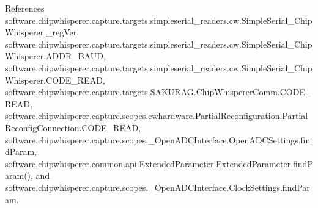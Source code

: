 References software.\+chipwhisperer.\+capture.\+targets.\+simpleserial\+\_\+readers.\+cw.\+Simple\+Serial\+\_\+\+Chip\+Whisperer.\+\_\+reg\+Ver, software.\+chipwhisperer.\+capture.\+targets.\+simpleserial\+\_\+readers.\+cw.\+Simple\+Serial\+\_\+\+Chip\+Whisperer.\+A\+D\+D\+R\+\_\+\+B\+A\+U\+D, software.\+chipwhisperer.\+capture.\+targets.\+simpleserial\+\_\+readers.\+cw.\+Simple\+Serial\+\_\+\+Chip\+Whisperer.\+C\+O\+D\+E\+\_\+\+R\+E\+A\+D, software.\+chipwhisperer.\+capture.\+targets.\+S\+A\+K\+U\+R\+A\+G.\+Chip\+Whisperer\+Comm.\+C\+O\+D\+E\+\_\+\+R\+E\+A\+D, software.\+chipwhisperer.\+capture.\+scopes.\+cwhardware.\+Partial\+Reconfiguration.\+Partial\+Reconfig\+Connection.\+C\+O\+D\+E\+\_\+\+R\+E\+A\+D, software.\+chipwhisperer.\+capture.\+scopes.\+\_\+\+Open\+A\+D\+C\+Interface.\+Open\+A\+D\+C\+Settings.\+find\+Param, software.\+chipwhisperer.\+common.\+api.\+Extended\+Parameter.\+Extended\+Parameter.\+find\+Param(), and software.\+chipwhisperer.\+capture.\+scopes.\+\_\+\+Open\+A\+D\+C\+Interface.\+Clock\+Settings.\+find\+Param.


